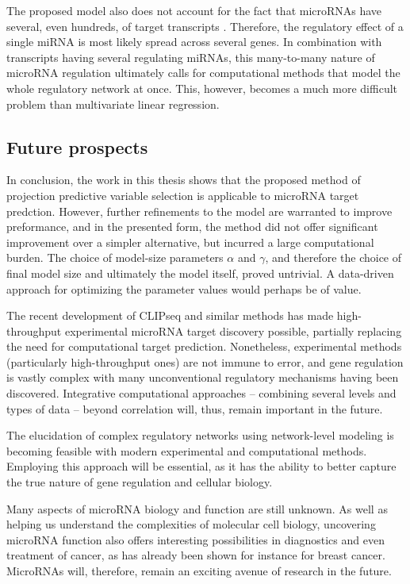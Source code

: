 The proposed model also does not account for the fact that microRNAs have
several, even hundreds, of target transcripts \citep{}. Therefore, the regulatory
effect of a single miRNA is most likely spread across several genes. In
combination with transcripts having several regulating miRNAs, this many-to-many
nature of microRNA regulation ultimately calls for computational methods
that model the whole regulatory network at once. This, however, becomes a much
more difficult problem than multivariate linear regression.


\subsection*{Future prospects}

In conclusion, the work in this thesis shows that the proposed method of
projection predictive variable selection is applicable to microRNA target
predction. However, further refinements to the model are warranted to
improve preformance, and in the presented form, the method did not offer
significant improvement over a simpler alternative, but incurred a large
computational burden. The choice of model-size parameters $\alpha$ and $\gamma$,
and therefore the choice of final model size and ultimately the model itself,
proved untrivial. A data-driven approach for optimizing the parameter values
would perhaps be of value.

The recent development of CLIPseq and similar methods has made high-throughput
experimental microRNA target discovery possible, partially replacing the need
for computational target prediction. Nonetheless, experimental methods
(particularly high-throughput ones) are not immune to error, and gene
regulation is vastly complex with many unconventional regulatory mechanisms
having been discovered. Integrative computational approaches --
combining several levels and types of data -- beyond correlation will, thus, remain
important in the future.

The elucidation of complex regulatory networks using
network-level modeling is becoming feasible with modern experimental and
computational methods. Employing this approach will be essential, as it has the
ability to better capture the true nature of gene regulation and cellular
biology.

Many aspects of microRNA biology and function are still unknown. As well as
helping us understand the complexities of molecular cell biology, uncovering
microRNA function also offers interesting possibilities in diagnostics and even
treatment of cancer, as has already been shown for instance for breast
cancer. MicroRNAs will, therefore, remain an exciting avenue of research in the future.
